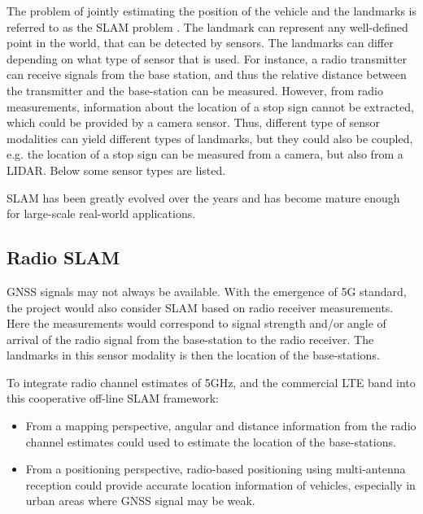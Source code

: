 The problem of jointly estimating the position of the vehicle and the landmarks
is referred to as the \gls{SLAM} problem
\cite{DBLP:journals/corr/CadenaCCLSN0L16}. The landmark can represent any
well-defined point in the world, that can be detected by sensors. The landmarks
can differ depending on what type of sensor that is used. For instance, a radio
transmitter can receive signals from the base station, and thus the relative
distance between the transmitter and the base-station can be measured. However,
from radio measurements, information about the location of a stop sign cannot
be extracted, which could be provided by a camera sensor. Thus, different type
of sensor modalities can yield different types of landmarks, but they could
also be coupled, e.g. the location of a stop sign can be measured from a
camera, but also from a \gls{LIDAR}. Below some sensor types are listed.

\gls{SLAM} has been greatly evolved over the years and has become mature enough
for large-scale real-world applications.

\subsection{Radio SLAM}

\gls{GNSS} signals may not always be available. With the emergence of 5G
standard, the project would also consider \gls{SLAM} based on radio receiver
measurements. Here the measurements would correspond to signal strength and/or
angle of arrival of the radio signal from the base-station to the radio
receiver. The landmarks in this sensor modality is then the location of the
base-stations.

To integrate radio channel estimates of 5GHz, and the commercial \gls{LTE} band into this cooperative
off-line \gls{SLAM} framework:
\begin{itemize}
\item   From a mapping perspective, angular and distance information
  from the radio channel estimates could used to estimate the location of the
  base-stations.
\item From a positioning perspective, radio-based positioning using
multi-antenna reception could provide accurate location information of
vehicles, especially in urban areas where \gls{GNSS} signal may be weak.
\end{itemize}

